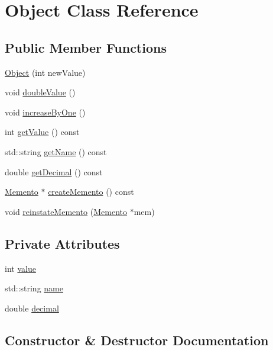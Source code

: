 \hypertarget{classObject}{}\section{Object Class Reference}
\label{classObject}
\subsection*{Public Member Functions}
\begin{DoxyCompactItemize}
\item 
\hyperlink{classObject_ae6203b4273493f4aa9177445264d3272}{Object} (int new\+Value)
\item 
void \hyperlink{classObject_a7e43ddd2f4647f67ba9d6f18dd24bf77}{double\+Value} ()
\item 
void \hyperlink{classObject_a406add870a5642dc0d931aec975288f9}{increase\+By\+One} ()
\item 
int \hyperlink{classObject_afb7a055f066071c9abae831e9e9485e7}{get\+Value} () const 
\item 
std\+::string \hyperlink{classObject_a6390f4fca865dc59e3442e9f0fb6bd5e}{get\+Name} () const 
\item 
double \hyperlink{classObject_a20acb478a579d175f3e6ee6f4354577b}{get\+Decimal} () const 
\item 
\hyperlink{classMemento}{Memento} $\ast$ \hyperlink{classObject_a169528dfd6ff33b21b038da8021cd748}{create\+Memento} () const 
\item 
void \hyperlink{classObject_a19d41bf5b99d4a5880aaab5640d8787a}{reinstate\+Memento} (\hyperlink{classMemento}{Memento} $\ast$mem)
\end{DoxyCompactItemize}
\subsection*{Private Attributes}
\begin{DoxyCompactItemize}
\item 
int \hyperlink{classObject_aff40b305580fdacdf3e2c63dfc181152}{value}
\item 
std\+::string \hyperlink{classObject_a24457e0a387492c80594aec7681a2277}{name}
\item 
double \hyperlink{classObject_abee4fc3561439ea77b960f839f5c8616}{decimal}
\end{DoxyCompactItemize}


\subsection{Constructor \& Destructor Documentation}
